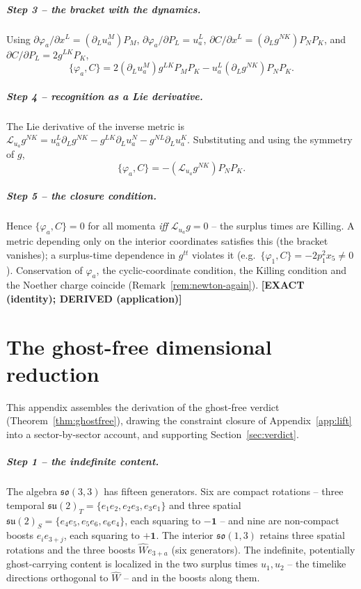 \documentclass[11pt,oneside]{book}
\newcommand{\Wh}{\hat{W}}                         %
\newcommand{\so}{\mathfrak{so}}
\newcommand{\Lie}{\mathcal{L}}
\newcommand{\status}[1]{{\sffamily\bfseries\color{statuscol}[#1]}}
\theoremstyle{plain}
\theoremstyle{definition}
\theoremstyle{remark}
\begin{document}
\paragraph{Step 3 -- the bracket with the dynamics.}
Using $\partial\varphi_a/\partial x^L=(\partial_Lu_a^M)P_M$,
$\partial\varphi_a/\partial P_L=u_a^L$,
$\partial C/\partial x^L=(\partial_Lg^{NK})P_NP_K$, and
$\partial C/\partial P_L=2g^{LK}P_K$,
\[
  \{\varphi_a,C\}=2(\partial_Lu_a^M)g^{LK}P_MP_K-u_a^L(\partial_Lg^{NK})P_NP_K.
\]

\paragraph{Step 4 -- recognition as a Lie derivative.}
The Lie derivative of the inverse metric is
$\Lie_{u_a}g^{NK}=u_a^L\partial_Lg^{NK}-g^{LK}\partial_Lu_a^N-g^{NL}\partial_Lu_a^K$.
Substituting and using the symmetry of $g$,
\[
  \{\varphi_a,C\}=-(\Lie_{u_a}g^{NK})P_NP_K.
\]

\paragraph{Step 5 -- the closure condition.}
Hence $\{\varphi_a,C\}=0$ for all momenta \emph{iff} $\Lie_{u_a}g=0$ -- the surplus
times are Killing. A metric depending only on the interior coordinates satisfies
this (the bracket vanishes); a surplus-time dependence in $g^{tt}$ violates it (e.g.\
$\{\varphi_1,C\}=-2p_1^2x_5\neq0$). Conservation of $\varphi_a$, the cyclic-coordinate
condition, the Killing condition and the Noether charge coincide
(Remark~\ref{rem:newton-again}). \status{EXACT (identity); DERIVED (application)}

\chapter{The ghost-free dimensional reduction}
\label{app:lift-verdict}

This appendix assembles the derivation of the ghost-free verdict
(Theorem~\ref{thm:ghostfree}), drawing the constraint closure of Appendix~\ref{app:lift} into a
sector-by-sector account, and supporting Section~\ref{sec:verdict}.

\paragraph{Step 1 -- the indefinite content.}
The algebra $\so(3,3)$ has fifteen generators. Six are compact rotations -- three temporal
$\mathfrak{su}(2)_T=\{e_1e_2,e_2e_3,e_3e_1\}$ and three spatial
$\mathfrak{su}(2)_S=\{e_4e_5,e_5e_6,e_6e_4\}$, each squaring to $-\mathbf 1$ -- and nine are
non-compact boosts $e_ie_{3+j}$, each squaring to $+\mathbf 1$. The interior $\so(1,3)$ retains
three spatial rotations and the three boosts $\Wh e_{3+a}$ (six generators). The indefinite,
potentially ghost-carrying content is localized in the two surplus times $u_1,u_2$ -- the
timelike directions orthogonal to $\Wh$ -- and in the boosts along them.
\end{document}
